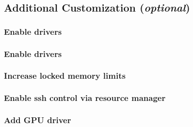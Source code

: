 \documentclass{ohpc-doc}
\begin{document}

\subsection{Additional Customization ({\em optional})} \label{sec:addl_customizations}


\subsubsection{Enable \InfiniBand{} drivers}


\subsubsection{Enable \OmniPath{} drivers}


\subsubsection{Increase locked memory limits}


\subsubsection{Enable ssh control via resource manager}


%

%
%
%

\subsubsection{Add GPU driver}

\end{document}
